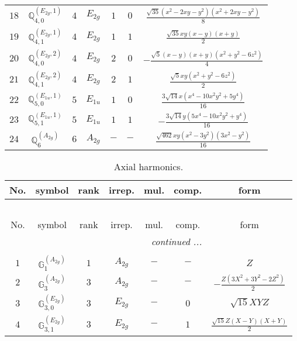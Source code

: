 \documentclass[fleqn,10pt,landscape]{article}
\begin{document}
\begin{itemize}
\begin{center}
\begin{longtable}{ccccccc}
$ 18 $ & $ \mathbb{Q}_{4,0}^{(E_{2g},1)} $ & $ 4 $ & $ E_{2g} $ & $ 1 $ & $ 0 $ & $ \frac{\sqrt{35} \left(x^{2} - 2 x y - y^{2}\right) \left(x^{2} + 2 x y - y^{2}\right)}{8} $ \\
$ 19 $ & $ \mathbb{Q}_{4,1}^{(E_{2g},1)} $ & $ 4 $ & $ E_{2g} $ & $ 1 $ & $ 1 $ & $ \frac{\sqrt{35} x y \left(x - y\right) \left(x + y\right)}{2} $ \\
$ 20 $ & $ \mathbb{Q}_{4,0}^{(E_{2g},2)} $ & $ 4 $ & $ E_{2g} $ & $ 2 $ & $ 0 $ & $ - \frac{\sqrt{5} \left(x - y\right) \left(x + y\right) \left(x^{2} + y^{2} - 6 z^{2}\right)}{4} $ \\
$ 21 $ & $ \mathbb{Q}_{4,1}^{(E_{2g},2)} $ & $ 4 $ & $ E_{2g} $ & $ 2 $ & $ 1 $ & $ \frac{\sqrt{5} x y \left(x^{2} + y^{2} - 6 z^{2}\right)}{2} $ \\ \hline
$ 22 $ & $ \mathbb{Q}_{5,0}^{(E_{1u},1)} $ & $ 5 $ & $ E_{1u} $ & $ 1 $ & $ 0 $ & $ \frac{3 \sqrt{14} x \left(x^{4} - 10 x^{2} y^{2} + 5 y^{4}\right)}{16} $ \\
$ 23 $ & $ \mathbb{Q}_{5,1}^{(E_{1u},1)} $ & $ 5 $ & $ E_{1u} $ & $ 1 $ & $ 1 $ & $ - \frac{3 \sqrt{14} y \left(5 x^{4} - 10 x^{2} y^{2} + y^{4}\right)}{16} $ \\ \hline
$ 24 $ & $ \mathbb{Q}_{6}^{(A_{2g})} $ & $ 6 $ & $ A_{2g} $ & $ - $ & $ - $ & $ \frac{\sqrt{462} x y \left(x^{2} - 3 y^{2}\right) \left(3 x^{2} - y^{2}\right)}{16} $ \\
\end{longtable}
\end{center}
\begin{center}
\renewcommand{\arraystretch}{1.3}
\begin{longtable}{ccccccc}
\caption{Axial harmonics.}
 \\
 \hline \hline
No. & symbol & rank & irrep. & mul. & comp. & form \\ \hline \endfirsthead

\multicolumn{6}{l}{\tablename\ \thetable{}} \\
 \hline \hline
No. & symbol & rank & irrep. & mul. & comp. & form \\ \hline \endhead

 \hline \hline
\multicolumn{6}{r}{\footnotesize\it continued ...} \\ \endfoot

 \hline \hline
\multicolumn{6}{r}{} \\ \endlastfoot

$ 1 $ & $ \mathbb{G}_{1}^{(A_{2g})} $ & $ 1 $ & $ A_{2g} $ & $ - $ & $ - $ & $ Z $ \\ \hline
$ 2 $ & $ \mathbb{G}_{3}^{(A_{2g})} $ & $ 3 $ & $ A_{2g} $ & $ - $ & $ - $ & $ - \frac{Z \left(3 X^{2} + 3 Y^{2} - 2 Z^{2}\right)}{2} $ \\
$ 3 $ & $ \mathbb{G}_{3,0}^{(E_{2g})} $ & $ 3 $ & $ E_{2g} $ & $ - $ & $ 0 $ & $ \sqrt{15} X Y Z $ \\
$ 4 $ & $ \mathbb{G}_{3,1}^{(E_{2g})} $ & $ 3 $ & $ E_{2g} $ & $ - $ & $ 1 $ & $ \frac{\sqrt{15} Z \left(X - Y\right) \left(X + Y\right)}{2} $ \\
\end{longtable}
\end{center}


\end{itemize}
\end{document}
